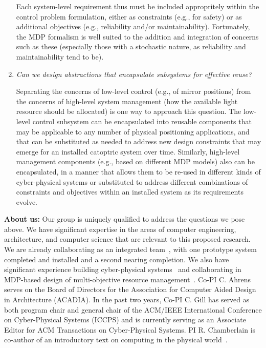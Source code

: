 \begin{enumerate}
Each system-level requirement thus must be included appropritely within
the control problem formulation, either as constraints (e.g., for
safety) or as additional objectives (e.g., reliability and/or maintainability).
Fortunately, the MDP formalism is well suited to the addition and integration 
of concerns such as these (especially those with a stochastic nature, as reliability
and maintainability tend to be).

\item \emph{Can we design abstractions that encapsulate subsystems for
effective reuse?}

Separating the concerns of low-level control (e.g., of mirror positions) from
the concerns of high-level system management (how the available light resource 
should be  allocated) is one way to approach this question.  The low-level control 
subsystem can be encapsulated into reusable components that may be applicable to 
any number of physical positioning applications, and that can be substituted as
needed to address new design constraints that may emerge for an installed catoptric 
system over time.  Similarly, high-level management components (e.g., based on 
different MDP models) also can be encapsulated, in a manner that allows them to be 
re-used in different kinds of cyber-physical systems or substituted to address 
different combinations of constraints and objectives within an installed system 
as its requirements evolve.

\end{enumerate}

\noindent
{\bf About us:}
Our group is uniquely qualified to address the questions we pose above.
We have significant expertise in the areas of computer engineering, architecture, 
and computer science that are relevant to this proposed research. We are already 
collaborating as an integrated team~\cite{cag18}, with one prototype system 
completed and installed and a second nearing completion.  We also have significant 
experience building cyber-physical systems~\cite{cew18,wgl17} and collaborating in 
MDP-based design of multi-objective resource management~\cite{mgc16}.
Co-PI C. Ahrens serves on the Board of Directors for the
Association for Computer Aided Design in Architecture (ACADIA).
In the past two years, Co-PI C. Gill has served as both program
chair and general chair of the ACM/IEEE International
Conference on Cyber-Physical Systems (ICCPS) and is currently
serving as an Associate Editor for ACM Transactions on Cyber-Physical
Systems.
PI R. Chamberlain is co-author of an introductory text on computing
in the physical world~\cite{cc17}.
